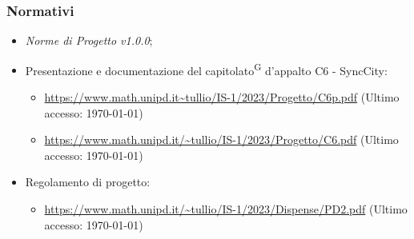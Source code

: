 \documentclass[8pt]{article}
\newcommand{\glossterm}[1]{#1\textsuperscript{G}} %
\begin{document}
\subsubsection{Normativi}
\begin{itemize}
	\item \textit{Norme di Progetto v1.0.0};
	\item Presentazione e documentazione del \glossterm{capitolato} d’appalto C6 - SyncCity:
	\begin{itemize}
		\item \href{https://www.math.unipd.it/~tullio/IS-1/2023/Progetto/C6p.pdf}{\color{myblue}https://www.math.unipd.it\textasciitilde{}tullio/IS-1/2023/Progetto/C6p.pdf} (Ultimo accesso: \today)
		\item \href{https://www.math.unipd.it/~tullio/IS-1/2023/Progetto/C6.pdf}{\color{myblue}https://www.math.unipd.it/\textasciitilde{}tullio/IS-1/2023/Progetto/C6.pdf} (Ultimo accesso: \today)
	\end{itemize}
	\item Regolamento di progetto:
	\begin{itemize}
		\item \href{https://www.math.unipd.it/~tullio/IS-1/2023/Dispense/PD2.pdf}{\color{myblue}https://www.math.unipd.it/\textasciitilde{}tullio/IS-1/2023/Dispense/PD2.pdf} (Ultimo accesso: \today)
	\end{itemize}
\end{itemize}
\clearpage
\end{document}
